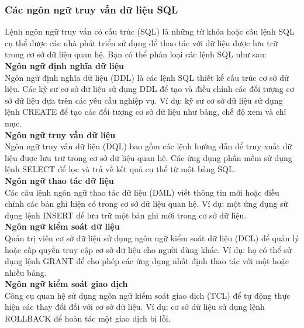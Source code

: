 \subsubsection{Các ngôn ngữ truy vấn dữ liệu SQL}
\hspace*{0.5cm}Lệnh ngôn ngữ truy vấn có cấu trúc (SQL) là những từ khóa hoặc câu lệnh SQL cụ thể được các nhà phát triển sử dụng để thao tác với dữ liệu được lưu trữ trong cơ sở dữ liệu quan hệ. Bạn có thể phân loại các lệnh SQL như sau:\\
\hspace*{0.5cm}\textbf{Ngôn ngữ định nghĩa dữ liệu}\\
\hspace*{0.5cm}Ngôn ngữ định nghĩa dữ liệu (DDL) là các lệnh SQL thiết kế cấu trúc cơ sở dữ liệu. Các kỹ sư cơ sở dữ liệu sử dụng DDL để tạo và điều chỉnh các đối tượng cơ sở dữ liệu dựa trên các yêu cầu nghiệp vụ. Ví dụ: kỹ sư cơ sở dữ liệu sử dụng lệnh CREATE để tạo các đối tượng cơ sở dữ liệu như bảng, chế độ xem và chỉ mục.\\
\hspace*{0.5cm}\textbf{Ngôn ngữ truy vấn dữ liệu}\\
\hspace*{0.5cm}Ngôn ngữ truy vấn dữ liệu (DQL) bao gồm các lệnh hướng dẫn để truy xuất dữ liệu được lưu trữ trong cơ sở dữ liệu quan hệ. Các ứng dụng phần mềm sử dụng lệnh SELECT để lọc và trả về kết quả cụ thể từ một bảng SQL.\\
\hspace*{0.5cm}\textbf{Ngôn ngữ thao tác dữ liệu}\\
\hspace*{0.5cm}Các câu lệnh ngôn ngữ thao tác dữ liệu (DML) viết thông tin mới hoặc điều chỉnh các bản ghi hiện có trong cơ sở dữ liệu quan hệ. Ví dụ: một ứng dụng sử dụng lệnh INSERT để lưu trữ một bản ghi mới trong cơ sở dữ liệu.\\
\hspace*{0.5cm}\textbf{Ngôn ngữ kiểm soát dữ liệu}\\
\hspace*{0.5cm}Quản trị viên cơ sở dữ liệu sử dụng ngôn ngữ kiểm soát dữ liệu (DCL) để quản lý hoặc cấp quyền truy cập cơ sở dữ liệu cho người dùng khác. Ví dụ: họ có thể sử dụng lệnh GRANT để cho phép các ứng dụng nhất định thao tác với một hoặc nhiều bảng.\\
\hspace*{0.5cm}\textbf{Ngôn ngữ kiểm soát giao dịch}\\
\hspace*{0.5cm}Công cụ quan hệ sử dụng ngôn ngữ kiểm soát giao dịch (TCL) để tự động thực hiện các thay đổi đối với cơ sở dữ liệu. Ví dụ: cơ sở dữ liệu sử dụng lệnh ROLLBACK để hoàn tác một giao dịch bị lỗi.
